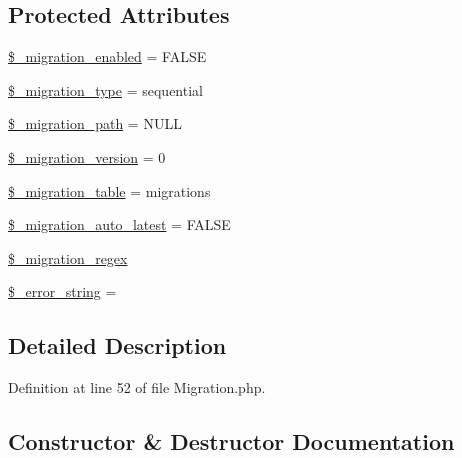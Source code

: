 \subsection*{Protected Attributes}
\begin{DoxyCompactItemize}
\item 
\mbox{\hyperlink{class_c_i___migration_a4ab2a6819f2d038b7ad2faa0a09161d1}{\$\+\_\+migration\+\_\+enabled}} = F\+A\+L\+SE
\item 
\mbox{\hyperlink{class_c_i___migration_a74ff9f79bd4a13fec8a3f08bc57ead97}{\$\+\_\+migration\+\_\+type}} = \textquotesingle{}sequential\textquotesingle{}
\item 
\mbox{\hyperlink{class_c_i___migration_a47cd630e42ae345f6e6ebe4235612a2e}{\$\+\_\+migration\+\_\+path}} = N\+U\+LL
\item 
\mbox{\hyperlink{class_c_i___migration_a6bffbb1001557bd7ffb22183b51f589d}{\$\+\_\+migration\+\_\+version}} = 0
\item 
\mbox{\hyperlink{class_c_i___migration_aba6d942d699615d04319339a0d6afac1}{\$\+\_\+migration\+\_\+table}} = \textquotesingle{}migrations\textquotesingle{}
\item 
\mbox{\hyperlink{class_c_i___migration_aabf374ca6bf453ebd07070a5c0dfc16f}{\$\+\_\+migration\+\_\+auto\+\_\+latest}} = F\+A\+L\+SE
\item 
\mbox{\hyperlink{class_c_i___migration_a0010078622b62542cdef48fe64fc519f}{\$\+\_\+migration\+\_\+regex}}
\item 
\mbox{\hyperlink{class_c_i___migration_a2574ed23c2ed6d71d6e8396f0c4fde0f}{\$\+\_\+error\+\_\+string}} = \textquotesingle{}\textquotesingle{}
\end{DoxyCompactItemize}


\subsection{Detailed Description}


Definition at line 52 of file Migration.\+php.



\subsection{Constructor \& Destructor Documentation}
\mbox{\label{class_c_i___migration_af7f9493844d2d66e924e3c1df51ce616}} 
